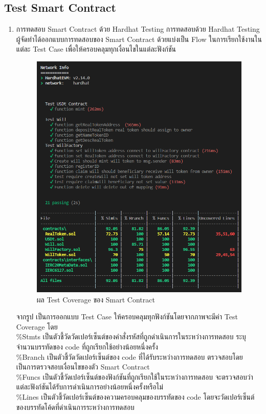 \documentclass[12pt,oneside,openright,a4paper]{cpe-thai-project}
\begin{document}
\subsection {Test Smart Contract}
\begin{enumerate}[label=\thesubsection.\arabic*,leftmargin=0pt,itemindent=1.25cm]
\item การทดสอบ Smart Contract ด้วย Hardhat Testing
	\tab การทดสอบด้วย Hardhat Testing ผู้จัดทำได้ออกแบบการทดสอบของ Smart Contract ด้วยแบ่งเป็น Flow ในการเรียกใช้งานในแต่ละ Test Case เพื่อให้ครอบคลุมทุกเงื่อนไขในแต่ละฟังก์ชัน
\begin{figure}[!thb]
			\centering
			\includegraphics[scale=0.5]{testCoverage}
			\caption{ผล Test Coverage ของ Smart Contract}
		\end{figure}
\FloatBarrier
\tab จากรูป เป็นการออกแบบ Test Case ให้ครอบคลุมทุกฟังก์ชันโดยจากภาพจะมีค่า Test Coverage โดย \\ \tab\%Stmts เป็นตัวชี้วัดวัดเปอร์เซ็นต์ของคำสั่งรหัสที่ถูกดำเนินการในระหว่างการทดสอบ ระบุจำนวนบรรทัดของ code ที่ถูกเรียกใช้อย่างน้อยหนึ่งครั้ง \\ \tab\%Branch เป็นตัวชี้วัดวัดเปอร์เซ็นต์ของ code ที่ได้รับระหว่างการทดสอบ ตรวจสอบโดยเป็นการตรวจสอบเงื่อนไขของตัว Smart Contract  \\ \tab\%Funcs เป็นตัวชี้วัดเปอร์เซ็นต์ของฟังก์ชันที่ถูกเรียกใช้ในระหว่างการทดสอบ จะตรวจสอบว่าแต่ละฟังก์ชันได้รับการดำเนินการอย่างน้อยหนึ่งครั้งหรือไม่  \\\tab\%Lines เป็นตัวชี้วัดเปอร์เซ็นต์ของความครอบคลุมของบรรทัดของ code โดยจะวัดเปอร์เซ็นต์ของบรรทัดโค้ดที่ดำเนินการระหว่างการทดสอบ
\end{enumerate}
\end{document}
